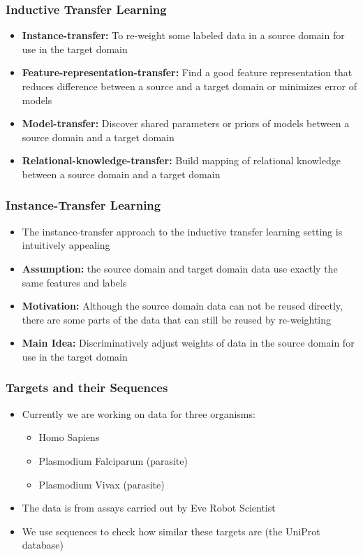 \documentclass[compress]{beamer}
\begin{document}
\begin{frame}
\frametitle{Inductive Transfer Learning} 
\begin{itemize}%
 \item \textbf{Instance-transfer:} To re-weight some labeled data in a source domain for use in the target domain %
 \item \textbf{Feature-representation-transfer:} Find a good feature representation that reduces difference between a source and a target domain or minimizes error of models
 \item \textbf{Model-transfer:} Discover shared parameters or priors of models between a source domain and a target domain
 \item \textbf{Relational-knowledge-transfer:} Build mapping of relational knowledge between a source domain and a target domain
 \end{itemize}
\end{frame}

\begin{frame}
\frametitle{Instance-Transfer Learning} 
\begin{itemize}%
 \item The instance-transfer approach to the inductive transfer learning setting is intuitively appealing
 \item \textbf{Assumption:} the source domain and target domain data use exactly the same features and labels
 \item \textbf{Motivation:} Although the source domain data can not be reused directly, there are some parts of the data that can still be reused by re-weighting
 \item \textbf{Main Idea:} Discriminatively adjust weights of data in the source domain for use in the target domain 
 \end{itemize}
\end{frame}

\begin{frame}
\frametitle{Targets and their Sequences} 
\begin{itemize}%
 \item Currently we are working on data for three organisms:
 \begin{itemize}%
   \item Homo Sapiens
   \item Plasmodium Falciparum (parasite)
   \item Plasmodium Vivax (parasite)
 \end{itemize}
  
  \item The data is from assays carried out by Eve Robot Scientist

 \item We use sequences to check how similar these targets are (the UniProt database)
 \end{itemize}
\end{frame}
\end{document}
